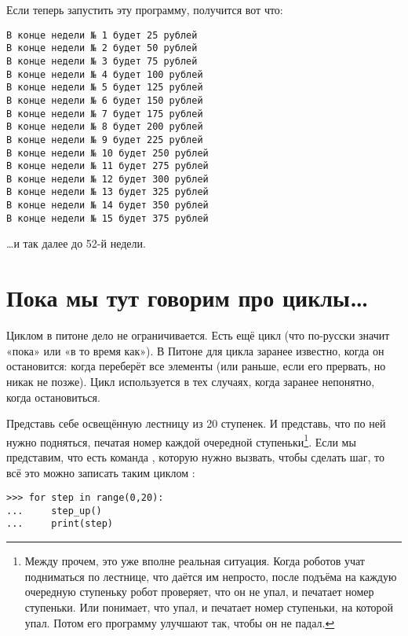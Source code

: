 Если теперь запустить эту программу, получится вот что:

\begin{listing}
\begin{verbatim}
В конце недели № 1 будет 25 рублей
В конце недели № 2 будет 50 рублей
В конце недели № 3 будет 75 рублей
В конце недели № 4 будет 100 рублей
В конце недели № 5 будет 125 рублей
В конце недели № 6 будет 150 рублей
В конце недели № 7 будет 175 рублей
В конце недели № 8 будет 200 рублей
В конце недели № 9 будет 225 рублей
В конце недели № 10 будет 250 рублей
В конце недели № 11 будет 275 рублей
В конце недели № 12 будет 300 рублей
В конце недели № 13 будет 325 рублей
В конце недели № 14 будет 350 рублей
В конце недели № 15 будет 375 рублей
\end{verbatim}
\end{listing}

…и так далее до 52-й недели.


\section{Пока мы тут говорим про циклы…}

Циклом  в питоне дело не ограничивается. Есть ещё цикл  (что по-русски значит «пока» или «в то время как»). В Питоне для цикла  заранее известно, когда он остановится: когда переберёт все элементы (или раньше, если его прервать, но никак не позже). Цикл  используется в тех случаях, когда заранее непонятно, когда остановиться.

Представь себе освещённую лестницу из 20 ступенек. И представь, что по ней нужно подняться, печатая номер каждой очередной ступеньки\footnote{Между прочем, это уже вполне реальная ситуация. Когда роботов учат подниматься по лестнице, что даётся им непросто, после подъёма на каждую очередную ступеньку робот проверяет, что он не упал, и печатает номер ступеньки. Или понимает, что упал, и печатает номер ступеньки, на которой упал. Потом его программу улучшают так, чтобы он не падал.}. Если мы представим, что есть команда , которую нужно вызвать, чтобы сделать шаг, то всё это можно записать таким циклом :

\begin{listing}
\begin{verbatim}
>>> for step in range(0,20):
...     step_up()
...     print(step)
\end{verbatim}
\end{listing}

